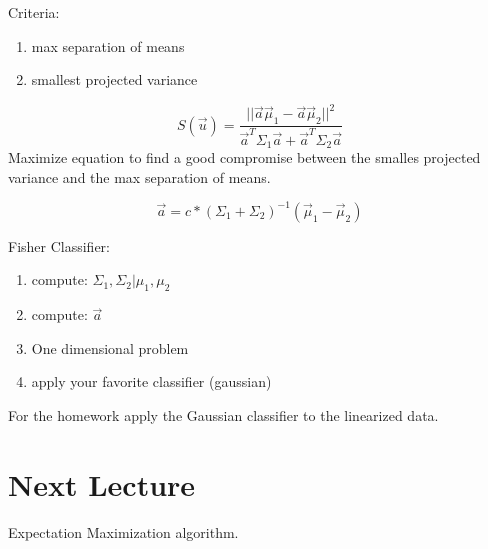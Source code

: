 \documentclass[letter, 9pt]{article}
\begin{document}
Criteria:
\begin{enumerate}
\item max separation of means
\item smallest projected variance
\end{enumerate}

\begin{equation}
S(\vec{u}) = \frac{||\vec{a} \vec{\mu}_1 - \vec{a} \vec{\mu}_2||^2}{\vec{a}^T \Sigma_1 \vec{a} + \vec{a}^T \Sigma_2 \vec{a}}
\end{equation}
Maximize equation to find a good compromise between the smalles projected variance and the max separation of means.

\begin{equation}
\vec{a} = c * (\Sigma_1 + \Sigma_2)^{-1} (\vec{\mu}_1 - \vec{\mu}_2)
\end{equation}

Fisher Classifier:
\begin{enumerate}
\item compute: $\Sigma_1, \Sigma_2 | \mu_1, \mu_2$
\item compute: $\vec{a}$
\item One dimensional problem
\item apply your favorite classifier (gaussian)
\end{enumerate}
For the homework apply the Gaussian classifier to the linearized data.

\section{Next Lecture}
Expectation Maximization algorithm.
\end{document}
